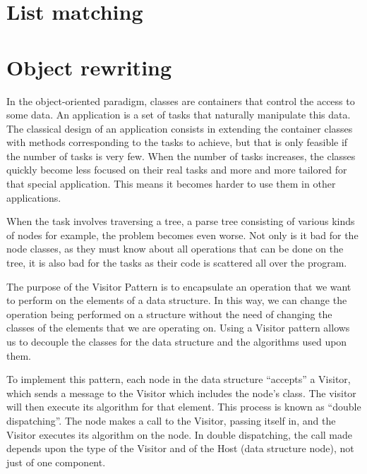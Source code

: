 
\section{List matching}




\section{Object rewriting}

In the object-oriented paradigm, classes are containers that control
the access to some data. 
An application is a set of tasks that naturally manipulate this data.
The classical design of an application consists in extending 
the container classes with methods corresponding to the tasks to
achieve, but that is only feasible if the number of tasks is very few.
When the number of tasks increases, the classes quickly become less
focused on their real tasks and more and more tailored for that
special application. This means it becomes harder to use them  in
other applications.  

When the task involves traversing a tree, a parse tree consisting of
various kinds of nodes for example, the problem becomes even
worse. Not only is it bad for the node classes, as they must know
about all operations that can be done  on the tree, it is also bad for
the tasks as their code is scattered all over the program. 

The purpose of the Visitor Pattern is to encapsulate an operation that
we want to perform on the elements of a data structure. In this
way, we can change the operation being performed on a structure
without the need of changing the classes of the elements that we are
operating on. Using a Visitor pattern allows us to decouple the
classes for the data structure and the algorithms used upon them.

To implement this pattern, each node in the data structure ``accepts''
a Visitor, which sends a message to the Visitor which includes the
node's class. The visitor will then execute its algorithm for that
element. This process is known as ``double dispatching''. The node makes
a call to the Visitor, passing itself in, and the Visitor executes its
algorithm on the node. In double dispatching, the call made depends
upon the type of the Visitor and of the Host (data structure node),
not just of one component. 

